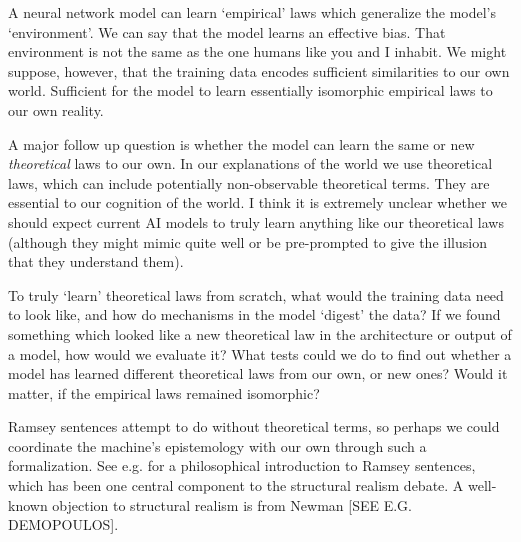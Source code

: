 A neural network model can learn `empirical' laws which generalize the model's `environment'.  We can say that the model learns an effective bias. That environment is not the same as the one humans like you and I inhabit.   We might suppose, however, that the training data encodes sufficient similarities to our own world.  Sufficient for the model to learn essentially isomorphic empirical laws to our own reality.

A major follow up question is whether the model can learn the same or new \emph{theoretical} laws to our own.  In our explanations of the world we use theoretical laws, which can include potentially non-observable theoretical terms.  They are essential to our cognition of the world.  I think it is extremely unclear whether we should expect current AI models to truly learn anything like our theoretical laws (although they might mimic quite well or be pre-prompted to give the illusion that they understand them).  

To truly `learn' theoretical laws from scratch, what would the training data need to look like, and how do mechanisms in the model `digest' the data?  If we found something which looked like a new theoretical law in the architecture or output of a model, how would we evaluate it?  What tests could we do to find out whether a model has learned different theoretical laws from our own, or new ones?  Would it matter, if the empirical laws remained isomorphic?

Ramsey sentences attempt to do without theoretical terms, so perhaps we could coordinate the machine's epistemology with our own through such a formalization.  See e.g. \citep[\S 26]{Carnap1966} for a philosophical introduction to Ramsey sentences, which has been one central component to the structural realism debate.  A well-known objection to structural realism is from Newman [SEE E.G. DEMOPOULOS].  



